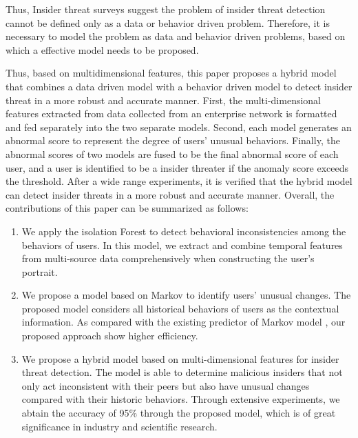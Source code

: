 \documentclass[conference]{IEEEtran}
\begin{document}
Thus, Insider threat surveys\cite{b9} suggest the problem of insider threat detection cannot be defined only as a data or behavior driven problem. Therefore, it is necessary to model the problem as data and behavior driven problems, based on which a effective model needs to be proposed.

Thus, based on multidimensional features, this paper proposes a hybrid model that combines a data driven model with a behavior driven model to detect insider threat in a more robust and accurate manner.
First, the multi-dimensional features extracted from data collected  from an enterprise network is formatted and fed separately into the two separate models. Second, each model generates an abnormal score to represent the degree of users' unusual behaviors. Finally, the abnormal scores of two models are fused to be the final abnormal score of each user, and a user is identified to be a insider threater if the anomaly score exceeds the threshold. 
After a wide range experiments, it is 
verified that the hybrid model can detect insider threats in a more robust and accurate manner.
Overall, the contributions of this paper can be summarized as follows:


\begin{enumerate}
\item 
We apply the isolation Forest to detect behavioral inconsistencies among the behaviors of users. In this model, we extract and combine temporal features from multi-source data comprehensively when constructing the user's portrait.

\item We propose a model based on Markov to identify users' unusual changes. The proposed model considers all historical behaviors of users as the contextual information. As compared with the existing predictor of Markov model \cite{b7}, our proposed approach show higher efficiency.


\item We propose a hybrid model based on multi-dimensional features for insider threat detection. The model is able to determine malicious insiders that not only act inconsistent with their peers but also have unusual changes compared with their historic behaviors. 
Through extensive experiments, we abtain the accuracy of 95\% through the proposed model, which is of great significance in industry and scientific research.
 


\end{enumerate}
\end{document}
